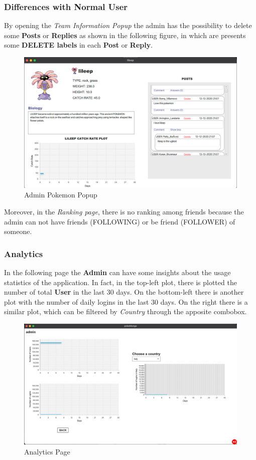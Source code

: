 \subsubsection{Differences with Normal User}
By opening the \textit{Team Information Popup} the admin has the possibility to delete some \textbf{Posts} or \textbf{Replies} as shown in the following figure, in which are presents some \textbf{DELETE labels} in each \textbf{Post} or \textbf{Reply}.
\begin{figure}[H]
	\centering
	\includegraphics[width=\textwidth]{img/userManual/admin_pokemon_window.png}
	\caption{Admin Pokemon Popup}
\end{figure}
Moreover, in the \textit{Ranking page}, there is no ranking among friends because the admin can not have friends (FOLLOWING) or be friend (FOLLOWER) of someone.

\subsubsection{Analytics}
In the following page the \textbf{Admin} can have some insights about the usage statistics of the application. In fact, in the top-left plot, there is plotted the number of total \textbf{User} in the last 30 days. On the bottom-left there is another plot with the number of daily logins in the last 30 days.
On the right there is a similar plot, which can be filtered by \textit{Country} through the apposite combobox.
\begin{figure}[H]
	\centering
	\includegraphics[width=\textwidth]{img/userManual/usage_statistics.png}
	\caption{Analytics Page}
\end{figure}

